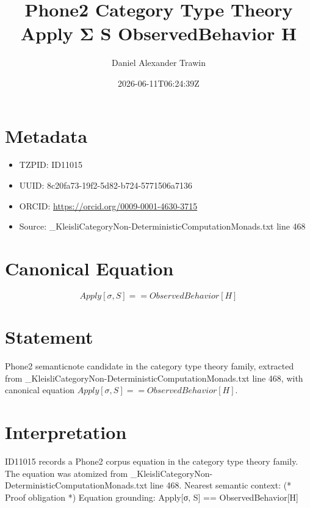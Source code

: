\documentclass[11pt]{article}
\title{Phone2 Category Type Theory Apply Σ S ObservedBehavior H}
\author{Daniel Alexander Trawin}
\date{2026-06-11T06:24:39Z}
\begin{document}
\maketitle
\section*{Metadata}
\begin{itemize}
\item TZPID: ID11015
\item UUID: 8c20fa73-19f2-5d82-b724-5771506a7136
\item ORCID: \url{https://orcid.org/0009-0001-4630-3715}
\item Source: _KleisliCategoryNon-DeterministicComputationMonads.txt line 468
\end{itemize}
\section*{Canonical Equation}
\[
Apply[σ, S] == ObservedBehavior[H]
\]
\section*{Statement}
Phone2 semanticnote candidate in the category type theory family, extracted from _KleisliCategoryNon-DeterministicComputationMonads.txt line 468, with canonical equation $Apply[σ, S] == ObservedBehavior[H]$.
\section*{Interpretation}
ID11015 records a Phone2 corpus equation in the category type theory family. The equation was atomized from _KleisliCategoryNon-DeterministicComputationMonads.txt line 468. Nearest semantic context: (* Proof obligation *) Equation grounding: Apply[σ, S] == ObservedBehavior[H]
\end{document}
